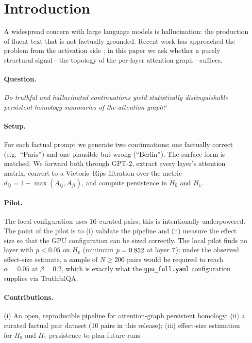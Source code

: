 \section{Introduction}
A widespread concern with large language models is hallucination: the
production of fluent text that is not factually grounded. Recent work
has approached the problem from the activation side
\cite{azaria2023internal,burns2023discovering}; in this paper we ask
whether a purely structural signal---the topology of the per-layer
attention graph---suffices.

\paragraph{Question.} \emph{Do truthful and hallucinated continuations
yield statistically distinguishable persistent-homology summaries of
the attention graph?}

\paragraph{Setup.} For each factual prompt we generate two
continuations: one factually correct (e.g.\ ``Paris'') and one
plausible but wrong (``Berlin''). The surface form is matched. We
forward both through GPT-2, extract every layer's attention matrix,
convert to a Vietoris--Rips filtration over the metric
$d_{ij}=1-\max(A_{ij},A_{ji})$, and compute persistence in $H_0$ and
$H_1$.

\paragraph{Pilot.} The local configuration uses $10$ curated
pairs; this is intentionally underpowered. The point of the pilot is to
(i) validate the pipeline and (ii) measure the effect size so that the
GPU configuration can be sized correctly. The local pilot finds no
layer with $p<0.05$ on $H_0$ (minimum $p=0.852$ at layer
$7$); under the observed effect-size estimate, a
sample of $N\ge 200$ pairs would be required to reach $\alpha=0.05$ at
$\beta=0.2$, which is exactly what the
\texttt{gpu\_full.yaml} configuration supplies via TruthfulQA.

\paragraph{Contributions.} (i) An open, reproducible pipeline for
attention-graph persistent homology; (ii) a curated factual pair
dataset (10 pairs in this release); (iii) effect-size estimation for
$H_0$ and $H_1$ persistence to plan future runs.
